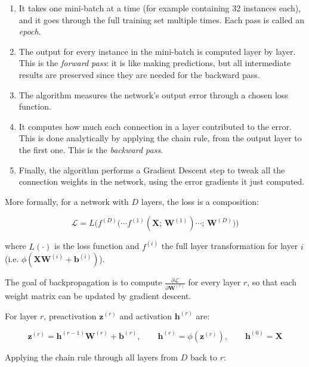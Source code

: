 \begin{enumerate}
    \item It takes one mini-batch at a time (for example containing 32 instances each), and it goes through the full training set multiple times. Each pass is called an \textit{epoch}.
    \item The output for every instance in the mini-batch is computed layer by layer. This is the \textit{forward pass}: it is like making predictions, but all intermediate results are preserved since they are needed for the backward pass.
    \item The algorithm measures the network's output error through a chosen loss function.
    \item It computes how much each connection in a layer contributed to the error. This is done analytically by applying the chain rule, from the output layer to the first one. This is the \textit{backward pass}.
    \item Finally, the algorithm performs a Gradient Descent step to tweak all the connection weights in the network, using the error gradients it just computed.
\end{enumerate}

More formally, for a network with $D$ layers, the loss is a composition:

\begin{equation}
    \mathcal{L} = L\!\Big(f^{(D)}\big(\cdots f^{(1)}(\mathbf{X};\, \mathbf{W}^{(1)}) \cdots;\, \mathbf{W}^{(D)}\big)\Big)
\end{equation}

where $L(\cdot)$ is the loss function and $f^{(i)}$ the full layer transformation for layer $i$ (i.e. $\phi\!\left(\mathbf{X}\mathbf{W}^{(i)} + \mathbf{b}^{(i)}\right)$).

The goal of backpropagation is to compute $\frac{\partial \mathcal{L}}{\partial \mathbf{W}^{(r)}}$ for every layer $r$, so that each weight matrix can be updated by gradient descent.

For layer $r$, preactivation $\mathbf{z}^{(r)}$ and activation $\mathbf{h}^{(r)}$ are:

\begin{equation}
    \mathbf{z}^{(r)} = \mathbf{h}^{(r-1)} \mathbf{W}^{(r)} + \mathbf{b}^{(r)}, \qquad \mathbf{h}^{(r)} = \phi\!\left(\mathbf{z}^{(r)}\right), \qquad \mathbf{h}^{(0)} = \mathbf{X}
\end{equation}

Applying the chain rule through all layers from $D$ back to $r$:

